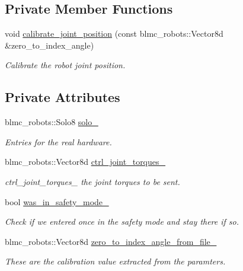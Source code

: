 \subsection*{Private Member Functions}
\begin{DoxyCompactItemize}
\item 
void \hyperlink{classdg__blmc__robots_1_1DGMSolo8_adc94f7989828834b503739c51d4af3fe}{calibrate\+\_\+joint\+\_\+position} (const blmc\+\_\+robots\+::\+Vector8d \&zero\+\_\+to\+\_\+index\+\_\+angle)
\begin{DoxyCompactList}\small\item\em Calibrate the robot joint position. \end{DoxyCompactList}\end{DoxyCompactItemize}
\subsection*{Private Attributes}
\begin{DoxyCompactItemize}
\item 
blmc\+\_\+robots\+::\+Solo8 \hyperlink{classdg__blmc__robots_1_1DGMSolo8_a65ce342929838851ee3fe9f0f9633088}{solo\+\_\+}
\begin{DoxyCompactList}\small\item\em Entries for the real hardware. \end{DoxyCompactList}\item 
blmc\+\_\+robots\+::\+Vector8d \hyperlink{classdg__blmc__robots_1_1DGMSolo8_a81971c21240a172c936c56cdfbf0a02c}{ctrl\+\_\+joint\+\_\+torques\+\_\+}
\begin{DoxyCompactList}\small\item\em ctrl\+\_\+joint\+\_\+torques\+\_\+ the joint torques to be sent. \end{DoxyCompactList}\item 
bool \hyperlink{classdg__blmc__robots_1_1DGMSolo8_a4ab54e51e268880d3e34144fbb1ee7a5}{was\+\_\+in\+\_\+safety\+\_\+mode\+\_\+}\hypertarget{classdg__blmc__robots_1_1DGMSolo8_a4ab54e51e268880d3e34144fbb1ee7a5}{}\label{classdg__blmc__robots_1_1DGMSolo8_a4ab54e51e268880d3e34144fbb1ee7a5}

\begin{DoxyCompactList}\small\item\em Check if we entered once in the safety mode and stay there if so. \end{DoxyCompactList}\item 
blmc\+\_\+robots\+::\+Vector8d \hyperlink{classdg__blmc__robots_1_1DGMSolo8_a91b31486cb3fe3de16043f7fb4d6cc74}{zero\+\_\+to\+\_\+index\+\_\+angle\+\_\+from\+\_\+file\+\_\+}
\begin{DoxyCompactList}\small\item\em These are the calibration value extracted from the paramters. \end{DoxyCompactList}\end{DoxyCompactItemize}



